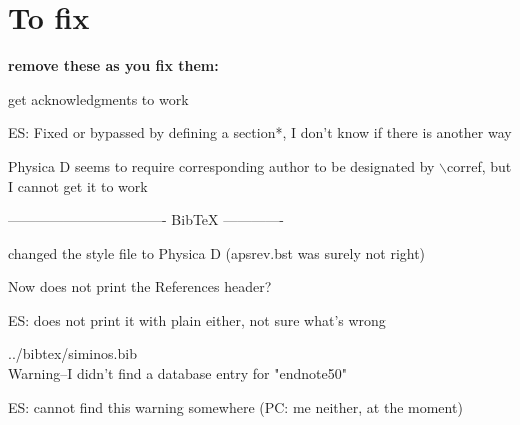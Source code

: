 
\section*{To fix}

{\bf remove these as you fix them:}


get 
acknowledgments to work

ES: Fixed or bypassed by defining a section*, I don't know if there is another way

Physica D seems to require corresponding author to be designated by $\backslash$corref, but I cannot get it to work

---------------------------------- BibTeX -------------


changed the style file to Physica D (apsrev.bst was surely not right)

Now does not print the References header?

ES: does not print it with plain either, not sure what's wrong 

../bibtex/siminos.bib
\\
Warning--I didn't find a database entry for "endnote50"

ES: cannot find this warning somewhere 
(PC: me neither, at the moment)